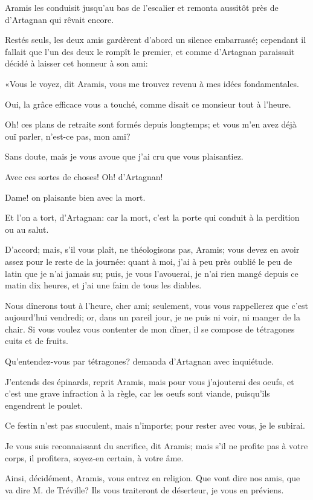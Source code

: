 Aramis les conduisit jusqu'au bas de l'escalier et remonta aussitôt près de d'Artagnan qui rêvait encore. 

Restés seuls, les deux amis gardèrent d'abord un silence embarrassé; cependant il fallait que l'un des deux le rompît le premier, et comme d'Artagnan paraissait décidé à laisser cet honneur à son ami: 

«Vous le voyez, dit Aramis, vous me trouvez revenu à mes idées fondamentales. 

\speak  Oui, la grâce efficace vous a touché, comme disait ce monsieur tout à l'heure. 

\speak  Oh! ces plans de retraite sont formés depuis longtemps; et vous m'en avez déjà ouï parler, n'est-ce pas, mon ami? 

\speak  Sans doute, mais je vous avoue que j'ai cru que vous plaisantiez. 

\speak  Avec ces sortes de choses! Oh! d'Artagnan! 

\speak  Dame! on plaisante bien avec la mort. 

\speak  Et l'on a tort, d'Artagnan: car la mort, c'est la porte qui conduit à la perdition ou au salut. 

\speak  D'accord; mais, s'il vous plaît, ne théologisons pas, Aramis; vous devez en avoir assez pour le reste de la journée: quant à moi, j'ai à peu près oublié le peu de latin que je n'ai jamais su; puis, je vous l'avouerai, je n'ai rien mangé depuis ce matin dix heures, et j'ai une faim de tous les diables. 

\speak  Nous dînerons tout à l'heure, cher ami; seulement, vous vous rappellerez que c'est aujourd'hui vendredi; or, dans un pareil jour, je ne puis ni voir, ni manger de la chair. Si vous voulez vous contenter de mon dîner, il se compose de tétragones cuits et de fruits. 

\speak  Qu'entendez-vous par tétragones? demanda d'Artagnan avec inquiétude. 

\speak  J'entends des épinards, reprit Aramis, mais pour vous j'ajouterai des oeufs, et c'est une grave infraction à la règle, car les oeufs sont viande, puisqu'ils engendrent le poulet. 

\speak  Ce festin n'est pas succulent, mais n'importe; pour rester avec vous, je le subirai. 

\speak  Je vous suis reconnaissant du sacrifice, dit Aramis; mais s'il ne profite pas à votre corps, il profitera, soyez-en certain, à votre âme. 

\speak  Ainsi, décidément, Aramis, vous entrez en religion. Que vont dire nos amis, que va dire M. de Tréville? Ils vous traiteront de déserteur, je vous en préviens. 

